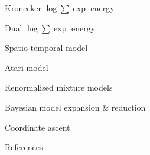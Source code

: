 \documentclass{beamer}
\begin{document}
\begin{frame}{Kronecker $\log \sum \exp$ energy}
\end{frame}

\begin{frame}{Dual $\log \sum \exp$ energy}
\end{frame}

\begin{frame}{Spatio-temporal model}
\end{frame}

\begin{frame}{Atari model}
\end{frame}

\begin{frame}{Renormalised mixture models}
\end{frame}

\begin{frame}{Bayesian model expansion \& reduction}
\end{frame}

\begin{frame}{Coordinate ascent}
\end{frame}


\begin{frame}{References}
    
    
\end{frame}
\end{document}
